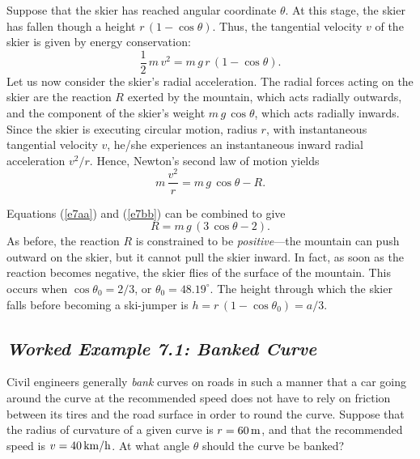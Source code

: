 Suppose that the skier has reached angular coordinate $\theta$. At this stage, the
skier has fallen though a height $r\,(1-\cos\theta)$. Thus, the tangential
velocity $v$ of the skier is given by energy conservation:
\begin{equation}\label{e7aa}
\frac{1}{2}\,m\,v^2 = m\,g\,r\, (1-\cos\theta).
\end{equation}
Let us now consider the skier's radial acceleration. The radial forces acting
on the skier are the reaction $R$ exerted by the mountain, which acts radially
outwards, and the component of the skier's weight $m\,g\,\cos\theta$, which
acts radially inwards. Since the skier is executing circular motion, radius $r$,
with instantaneous tangential velocity $v$, he/she experiences an instantaneous
inward radial acceleration $v^2/r$. Hence, Newton's second law of motion
yields
\begin{equation}\label{e7bb}
m\,\frac{v^2}{r} = m\,g\,\cos\theta - R.
\end{equation}

Equations (\ref{e7aa}) and (\ref{e7bb}) can be combined to give
\begin{equation}
R = m\,g\,(3\,\cos\theta-2).
\end{equation}
As before, the reaction $R$ is constrained to be {\em  positive}---the
mountain can push outward on the skier, but it cannot pull the skier inward.
In fact, as soon as the reaction becomes negative, the skier flies of
the surface of the mountain. This occurs when $\cos\theta_0 = 2/3$, or
$\theta_0 = 48.19^\circ$. The height through which the skier falls
before becoming a ski-jumper is $h=r\,(1-\cos\theta_0) = a/3$.

\subsection*{\em Worked Example 7.1: Banked Curve}
 Civil engineers generally {\em bank} curves on roads in such a manner
that a car going around the curve at the recommended speed does not have to
rely on  friction between its tires and the road surface in order to round the curve.
Suppose that the radius of curvature of a given curve is $r=60\,{\rm m}$, and that
the recommended speed is $v=40\,{\rm km/h}$. At what angle $\theta$ should the
curve be banked?

\begin{figure*}
\epsfysize=1.75in
\centerline{}
\end{figure*}

